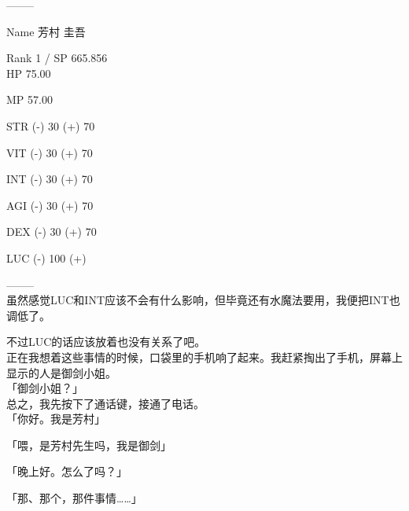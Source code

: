  --------

  Name 芳村 圭吾

  Rank 1 / SP 665.856\\

  HP  75.00

  MP  57.00

%  


  STR (-)  30 (+) {70}

  VIT (-)  30 (+) {70}

  INT (-)  30 (+) {70}

  AGI (-)  30 (+) {70}

  DEX (-)  30 (+) {70}

  LUC (-) 100 (+)

  --------\\

虽然感觉LUC和INT应该不会有什么影响，但毕竟还有水魔法要用，我便把INT也调低了。

不过LUC的话应该放着也没有关系了吧。\\

正在我想着这些事情的时候，口袋里的手机响了起来。我赶紧掏出了手机，屏幕上显示的人是御剑小姐。\\

「御剑小姐？」\\

总之，我先按下了通话键，接通了电话。\\

「你好。我是芳村」

「喂，是芳村先生吗，我是御剑」

「晚上好。怎么了吗？」

「那、那个，那件事情……」\\


